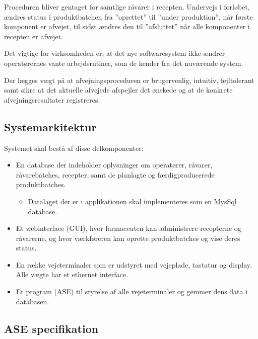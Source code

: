 \documentclass[a4paper]{article}
\begin{document}
Proceduren bliver gentaget for samtlige råvarer i recepten. Undervejs i forløbet, ændres status i produktbatchen fra ”oprettet” til ”under produktion”, når første komponent er afvejet, til sidst ændres den til ”afsluttet” når alle komponenter i recepten er afvejet.

Det vigtige for virksomheden er, at det nye softwaresystem ikke ændrer operatørernes vante arbejdsrutiner, som de kender fra det nuværende system.

Der lægges vægt på at afvejningsproceduren er brugervenlig, intuitiv, fejltolerant samt sikre at det aktuelle afvejede afspejler det ønskede og at de konkrete afvejningsresultater registreres.



\subsection{Systemarkitektur} %

Systemet skal bestå af disse delkomponenter:

\begin{itemize}
  \item En database der indeholder oplysninger om operatører, råvarer, råvarebatches, recepter, samt de planlagte og færdigproducerede produktbatches. 
    \begin{itemize}
      \item Datalaget der er i applikationen skal implementeres som en MysSql database.
    \end{itemize}
  \item Et webinterface (GUI), hvor farmaceuten kan administrere recepterne og råvarerne, og hvor værkføreren kan oprette produktbatches og vise deres status.
  \item En række vejeterminaler som er udstyret med vejeplade, tastatur og display. Alle vægte har et ethernet interface. 
  \item Et program (ASE) til styrelse af alle vejeterminaler og gemmer dens data i databasen.
\end{itemize}


\subsection{ASE specifikation} %
\end{document}
